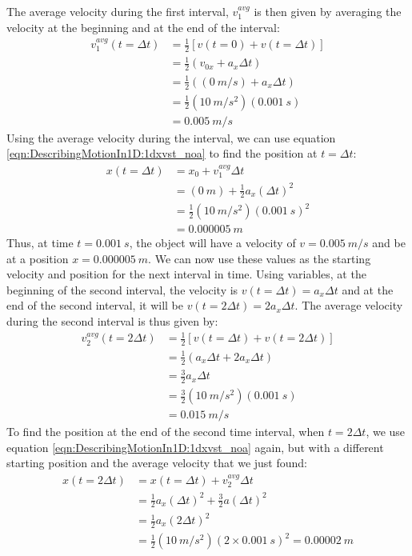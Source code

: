 The average velocity during the first interval, $v_1^{avg}$ is then given by averaging the velocity at the beginning and at the end of the interval:
\begin{align*}
v_1^{avg}(t=\Delta t)&=\frac{1}{2}\left[ v(t=0) + v(t=\Delta t)\right]\\
&=\frac{1}{2}\left(v_{0x}+a_x\Delta t\right)\\
&=\frac{1}{2}\left((\SI{0}{m/s})+a_x\Delta t\right)\\
&=\frac{1}{2}(\SI{10}{m/s^2})(\SI{0.001}{s})\\
&=\SI{0.005}{m/s}
\end{align*}
Using the average velocity during the interval, we can use equation \ref{eqn:DescribingMotionIn1D:1dxvst_noa} to find the position at $t=\Delta t$: 
\begin{align*}
x(t=\Delta t) &= x_0 +v_1^{avg}\Delta t\\
&=(\SI{0}{m}) + \frac{1}{2}a_x(\Delta t)^2\\
&= \frac{1}{2}(\SI{10}{m/s^2})(\SI{0.001}{s})^2\\
&=\SI{0.000005}{m}
\end{align*}
Thus, at time $t=\SI{0.001}{s}$, the object will have a velocity of $v=\SI{0.005}{m/s}$ and be at a position $x=\SI{0.000005}{m}$. We can now use these values as the starting velocity and position for the next interval in time. Using variables, at the beginning of the second interval, the velocity is $v(t=\Delta t)=a_x\Delta t$ and at the end of the second interval, it will be $v(t=2\Delta t)=2a_x\Delta t$. The average velocity during the second interval is thus given by:
\begin{align*}
v_2^{avg}(t=2\Delta t)&= \frac{1}{2}\left[v(t=\Delta t)+v(t=2\Delta t) \right]\\
&=\frac{1}{2}(a_x\Delta t+2a_x\Delta t)\\
&=\frac{3}{2}a_x\Delta t\\
&=\frac{3}{2}(\SI{10}{m/s^2})(\SI{0.001}{s})\\
&=\SI{0.015}{m/s}
\end{align*}
To find the position at the end of the second time interval, when $t=2\Delta t$, we use equation \ref{eqn:DescribingMotionIn1D:1dxvst_noa} again, but with a different starting position and the average velocity that we just found:
\begin{align*}
x(t=2\Delta t) &= x(t=\Delta t) +v_2^{avg}\Delta t\\
&= \frac{1}{2}a_x(\Delta t)^2+\frac{3}{2}a(\Delta t)^2\\
&= \frac{1}{2}a_x(2\Delta t)^2\\
&=\frac{1}{2}(\SI{10}{m/s^2})(2\times\SI{0.001}{s})^2=\SI{0.00002}{m}
\end{align*}
